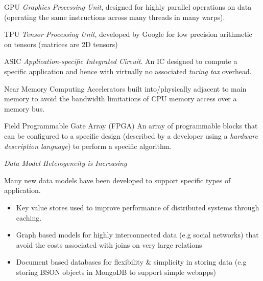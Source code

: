 \begin{tcbraster}[raster columns=2,raster equal height]
    \begin{definitionbox}{GPU}
        \textit{Graphics Processing Unit}, designed for highly parallel operations on data (operating the same instructions across many threads in many warps).
    \end{definitionbox}
    \begin{definitionbox}{TPU}
        \textit{Tensor Processing Unit}, developed by Google for low precision arithmetic on tensors (matrices are 2D tensors)
    \end{definitionbox}
    \begin{definitionbox}{ASIC}
        \textit{Application-specific Integrated Circuit}. An IC designed to compute a specific application and hence with virtually no associated \textit{turing tax} overhead.
    \end{definitionbox}
    \begin{definitionbox}{Near Memory Computing}
        Accelerators built into/physically adjacent to main memory to avoid the bandwidth limitations of CPU memory access over a memory bus.
    \end{definitionbox}
\end{tcbraster}
\begin{definitionbox}{Field Programmable Gate Array (FPGA)}
    An array of programmable blocks that can be configured to a specific design (described by a developer using a \textit{hardware description language}) to perform a specific algorithm.
\end{definitionbox}
\centerline{\textit{Data Model Heterogeneity is Increasing}}
Many new data models have been developed to support specific types of application.
\begin{itemize}
    \item Key value stores used to improve performance of distributed systems through caching.
    \item Graph based models for highly interconnected data (e.g social networks) that avoid the costs associated with joins on very large relations
    \item Document based databases for flexibility \& simplicity in storing data (e.g storing BSON objects in MongoDB to support simple webapps)
\end{itemize}

